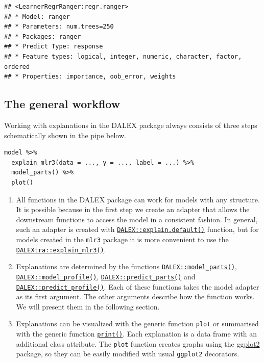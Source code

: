 \documentclass[
]{scrbook}
\begin{document}
\begin{verbatim}
## <LearnerRegrRanger:regr.ranger>
## * Model: ranger
## * Parameters: num.trees=250
## * Packages: ranger
## * Predict Type: response
## * Feature types: logical, integer, numeric, character, factor, ordered
## * Properties: importance, oob_error, weights
\end{verbatim}

\hypertarget{interpretability-architecture}{%
\subsection{The general workflow}\label{interpretability-architecture}}

Working with explanations in the DALEX package always consists of three steps schematically shown in the pipe below.

\begin{verbatim}
model %>%
  explain_mlr3(data = ..., y = ..., label = ...) %>%
  model_parts() %>%
  plot()
\end{verbatim}

\begin{enumerate}
\def\labelenumi{\arabic{enumi}.}
\item
  All functions in the DALEX package can work for models with any structure. It is possible because in the first step we create an adapter that allows the downstream functions to access the model in a consistent fashion. In general, such an adapter is created with \href{https://www.rdocumentation.org/packages/DALEX/topics/explain.default}{\texttt{DALEX::explain.default()}} function, but for models created in the \texttt{mlr3} package it is more convenient to use the \href{https://www.rdocumentation.org/packages/DALEXtra/topics/explain_mlr3}{\texttt{DALEXtra::explain\_mlr3()}}.
\item
  Explanations are determined by the functions \href{https://www.rdocumentation.org/packages/DALEX/topics/model_parts}{\texttt{DALEX::model\_parts()}}, \href{https://www.rdocumentation.org/packages/DALEX/topics/model_profile}{\texttt{DALEX::model\_profile()}}, \href{https://www.rdocumentation.org/packages/DALEX/topics/predict_parts}{\texttt{DALEX::predict\_parts()}} and \href{https://www.rdocumentation.org/packages/DALEX/topics/predict_profile}{\texttt{DALEX::predict\_profile()}}. Each of these functions takes the model adapter as its first argument. The other arguments describe how the function works. We will present them in the following section.
\item
  Explanations can be visualized with the generic function \texttt{plot} or summarised with the generic function \href{https://www.rdocumentation.org/packages/base/topics/print}{\texttt{print()}}. Each explanation is a data frame with an additional class attribute. The \texttt{plot} function creates graphs using the \href{https://cran.r-project.org/package=ggplot2}{ggplot2} package, so they can be easily modified with usual \texttt{ggplot2} decorators.
\end{enumerate}
\end{document}
